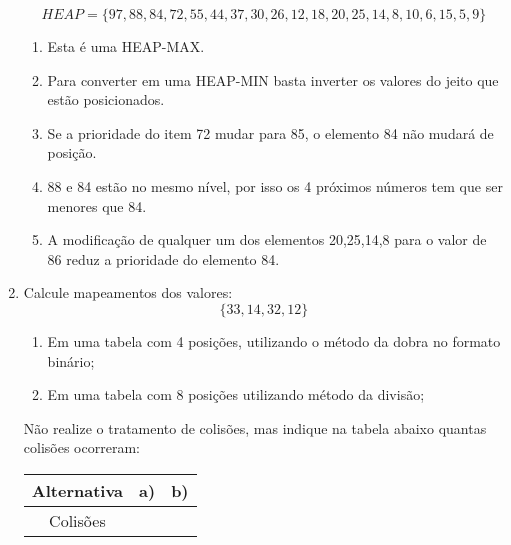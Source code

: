 \documentclass[11pt]{article}
\begin{document}
\begin{enumerate}[label=\textbf{Q\arabic*}]
          $$HEAP = \{97, 88, 84, 72, 55, 44, 37, 30, 26, 12, 18, 20, 25, 14, 8, 10, 6, 15, 5, 9\}$$
          \begin{enumerate}
              \item Esta é uma HEAP-MAX.
              \item Para converter em uma HEAP-MIN basta inverter os valores do jeito que estão posicionados.
              \item Se a prioridade do item 72 mudar para 85, o elemento 84 não mudará de posição.
              \item 88 e 84 estão no mesmo nível, por isso os 4 próximos números tem que ser menores que 84.
              \item A modificação de qualquer um dos elementos 20,25,14,8 para o valor de 86 reduz a prioridade do elemento 84.
          \end{enumerate}

    \item Calcule mapeamentos dos valores:
          $$\{33,14,32,12\}$$
          \begin{enumerate}
              \item Em uma tabela com 4 posições, utilizando o método da dobra no formato binário;
              \item Em uma tabela com 8 posições utilizando método da divisão;
          \end{enumerate}
          Não realize o tratamento de colisões, mas indique na tabela abaixo quantas colisões ocorreram:
          \begin{center}
              \begin{tabular}{|c|c|c|}
                  \hline
                  Alternativa & a) & b) \\
                  \hline
                  Colisões    & \  & \  \\
                  \hline
              \end{tabular}
          \end{center}
\end{enumerate}
\end{document}
